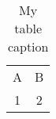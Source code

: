 \begin{table} 
    \begin{tabular}{ c c }
        A & B \\ 
        1 & 2 \\ 
    \end{tabular} 
    \caption{My table caption} 
\end{table}